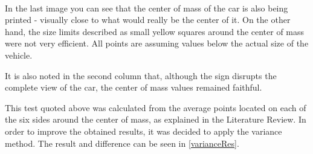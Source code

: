 \begin{figure}[H]
{    }
    \mbox{%
    \qquad
    }
    \mbox{%
    \qquad
    }
\end{figure}
    
    In the last image you can see that the center of mass of the car is also being printed - visually close to what would really be the center of it. On the other hand, the size limits described as small yellow squares around the center of mass were not very efficient. All points are assuming values below the actual size of the vehicle.

    It is also noted in the second column that, although the sign disrupts the complete view of the car, the center of mass values remained faithful.
    
    This test quoted above was calculated from the average points located on each of the six sides around the center of mass, as explained in the Literature Review. In order to improve the obtained results, it was decided to apply the variance method. The result and difference can be seen in \autoref{varianceRes}.

